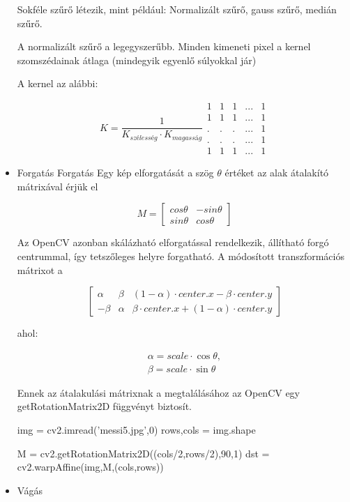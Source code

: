 \begin{itemize}
Sokféle szűrő létezik, mint például: Normalizált szűrő, gauss szűrő, medián szűrő.

A normalizált szűrő a legegyszerűbb. Minden kimeneti pixel a kernel szomszédainak átlaga (mindegyik egyenlő súlyokkal jár)

A kernel az alábbi:

\[K = \dfrac{1}{K_{szélesség} \cdot K_{magasság}}
\begin{matrix}
    1 & 1 & 1 & ... & 1 \\
    1 & 1 & 1 & ... & 1 \\
    . &. &. & ... & 1 \\
    . &. &. & ... & 1 \\
    1 & 1 & 1 & ... & 1   
\end{matrix}
\]
\item Forgatás
Forgatás
Egy kép elforgatását a szög $\theta$ értéket az alak átalakító mátrixával érjük el

$$M = \begin{bmatrix} cos\theta & -sin\theta \\ sin\theta & cos\theta   \end{bmatrix}$$

Az OpenCV azonban skálázható elforgatással rendelkezik, állítható forgó centrummal, így tetszőleges helyre forgatható. A módosított transzformációs mátrixot a

$$\begin{bmatrix}
\alpha &  \beta & (1- \alpha )  \cdot center.x -  \beta \cdot center.y \\ - \beta &  \alpha &  \beta \cdot center.x + (1- \alpha )  \cdot center.y
\end{bmatrix}$$

ahol:

$$\begin{array}{l}
\alpha =  scale \cdot \cos \theta , \\ \beta =  scale \cdot \sin \theta
\end{array}$$

Ennek az átalakulási mátrixnak a megtalálásához az OpenCV egy getRotationMatrix2D függvényt biztosít.

\begin{python}
img = cv2.imread('messi5.jpg',0)
rows,cols = img.shape

M = cv2.getRotationMatrix2D((cols/2,rows/2),90,1)
dst = cv2.warpAffine(img,M,(cols,rows))
\end{python}

\item Vágás


\end{itemize}
